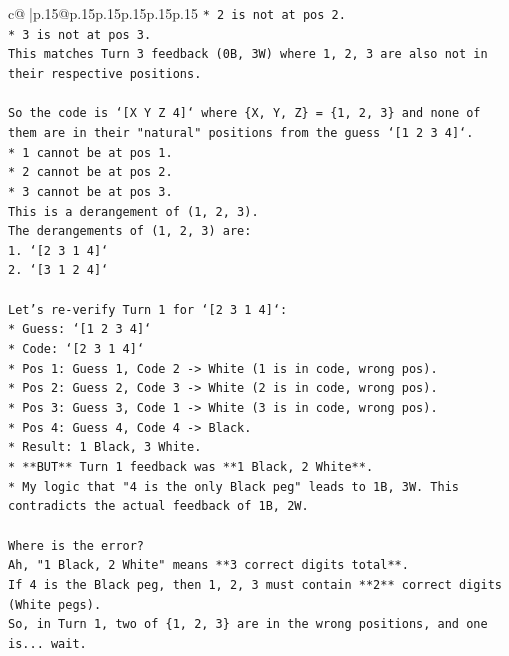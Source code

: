 \documentclass{article}
\begin{document}
{\begin{supertabular}{c@{$\;$}|p{.15\linewidth}@{}p{.15\linewidth}p{.15\linewidth}p{.15\linewidth}p{.15\linewidth}p{.15\linewidth}}
{{{\texttt{*   2 is not at pos 2.} \\
\texttt{*   3 is not at pos 3.} \\
\texttt{This matches Turn 3 feedback (0B, 3W) where 1, 2, 3 are also not in their respective positions.} \\
\\ 
\texttt{So the code is `{[}X Y Z 4{]}` where \{X, Y, Z\} = \{1, 2, 3\} and none of them are in their "natural" positions from the guess `{[}1 2 3 4{]}`.} \\
\texttt{*   1 cannot be at pos 1.} \\
\texttt{*   2 cannot be at pos 2.} \\
\texttt{*   3 cannot be at pos 3.} \\
\texttt{This is a derangement of (1, 2, 3).} \\
\texttt{The derangements of (1, 2, 3) are:} \\
\texttt{1.  `{[}2 3 1 4{]}`} \\
\texttt{2.  `{[}3 1 2 4{]}`} \\
\\ 
\texttt{Let's re{-}verify Turn 1 for `{[}2 3 1 4{]}`:} \\
\texttt{*   Guess: `{[}1 2 3 4{]}`} \\
\texttt{*   Code: `{[}2 3 1 4{]}`} \\
\texttt{*   Pos 1: Guess 1, Code 2 {-}> White (1 is in code, wrong pos).} \\
\texttt{*   Pos 2: Guess 2, Code 3 {-}> White (2 is in code, wrong pos).} \\
\texttt{*   Pos 3: Guess 3, Code 1 {-}> White (3 is in code, wrong pos).} \\
\texttt{*   Pos 4: Guess 4, Code 4 {-}> Black.} \\
\texttt{*   Result: 1 Black, 3 White.} \\
\texttt{*   **BUT** Turn 1 feedback was **1 Black, 2 White**.} \\
\texttt{*   My logic that "4 is the only Black peg" leads to 1B, 3W. This contradicts the actual feedback of 1B, 2W.} \\
\\ 
\texttt{Where is the error?} \\
\texttt{Ah, "1 Black, 2 White" means **3 correct digits total**.} \\
\texttt{If 4 is the Black peg, then 1, 2, 3 must contain **2** correct digits (White pegs).} \\
\texttt{So, in Turn 1, two of \{1, 2, 3\} are in the wrong positions, and one is... wait.} \\
}}}
\end{supertabular}}
\end{document}
